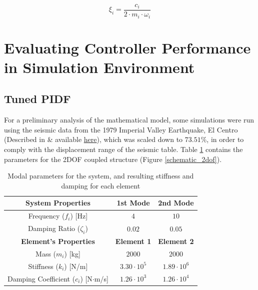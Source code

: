 \documentclass[9pt]{extarticle}
\begin{document}
\begin{equation}\label{eq_modal_damping} 
    \xi_i = \frac{ c_i}{2\cdot m_i\cdot \omega_i}
\end{equation}

\section{Evaluating Controller Performance in Simulation Environment}\label{Evaluating Controller Performance in Simulation Environment}

\subsection{Tuned PIDF}

For a preliminary analysis of the mathematical model, some simulations were run using the seismic data from the 1979  Imperial Valley Earthquake, El Centro (Described in \cite{narasimhan2006} \& available \href{https://github.com/c-radicallis/Controlo_Plataforma_Sismica}{here}), which was scaled down to $73.51\%$, in order to comply with the displacement range of the seismic table. Table \ref{tab:modal_params} contains the parameters for the 2DOF coupled structure (Figure \ref{schematic_2dof}).

\begin{table}[H]
    \centering
    \renewcommand{\arraystretch}{1.3}
    \begin{tabular}{|c|c|c|}
        \hline
        \textbf{System Properties} & \textbf{1st Mode} & \textbf{2nd Mode} \\
        \hline
        Frequency ($f_i$) [Hz] & $4$ & $10$ \\
        \hline
        Damping Ratio ($\zeta_i$) & $0.02$ & $0.05$ \\
        \hline
        \textbf{Element's Properties} & \textbf{Element 1} & \textbf{Element 2} \\
        \hline
        Mass ($m_i$) [kg] & $2000$ & $2000$ \\
        \hline
        Stiffness ($k_i$) [N/m] & $3.30\cdot 10^5$ & $1.89\cdot 10^6$ \\
        \hline
        Damping Coefficient ($c_i$) [N$\cdot$m/s] & $1.26\cdot 10^3$ & $1.26\cdot 10^4$ \\
        \hline
    \end{tabular}
    \caption{Modal parameters for the system, and resulting stiffness and damping for each element}
    \label{tab:modal_params}
\end{table}
\end{document}
